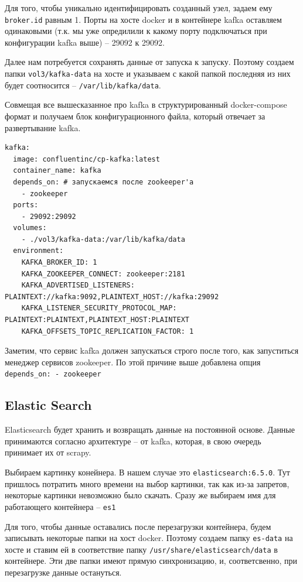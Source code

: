 Для того, чтобы уникально идентифицировать созданный узел, задаем ему
\verb|broker.id| равным 1. Порты на хосте docker и в контейнере kafka оставляем
одинаковыми (т.к. мы уже опредилили к какому порту подключаться при конфигурации
kafka выше) -- 29092 к 29092.

Далее нам потребуется сохранять данные от запуска к запуску. Поэтому создаем
папки \verb|vol3/kafka-data| на хосте и указываем с какой папкой последняя из
них будет соотносится -- \verb|/var/lib/kafka/data|.

Совмещая все вышесказанное про kafka в структурированный docker-compose формат и
получаем блок конфигурационного файла, который отвечает за развертывание kafka.
\begin{verbatim}
kafka:
  image: confluentinc/cp-kafka:latest
  container_name: kafka
  depends_on: # запускаемся после zookeeper'а
    - zookeeper
  ports:
    - 29092:29092
  volumes:
    - ./vol3/kafka-data:/var/lib/kafka/data
  environment:
    KAFKA_BROKER_ID: 1
    KAFKA_ZOOKEEPER_CONNECT: zookeeper:2181
    KAFKA_ADVERTISED_LISTENERS: PLAINTEXT://kafka:9092,PLAINTEXT_HOST://kafka:29092
    KAFKA_LISTENER_SECURITY_PROTOCOL_MAP: PLAINTEXT:PLAINTEXT,PLAINTEXT_HOST:PLAINTEXT
    KAFKA_OFFSETS_TOPIC_REPLICATION_FACTOR: 1
\end{verbatim}

Заметим, что сервис kafka должен запускаться строго после того, как запуститься
менеджер сервисов zookeeper. По этой причине выше добавлена опция
\verb|depends_on: - zookeeper|


\subsection{Elastic Search}
Elasticsearch будет хранить и возвращать данные на постоянной основе. Данные
принимаются согласно архитектуре -- от kafka, которая, в свою очередь принимает
их от scrapy.

Выбираем картинку конейнера. В нашем случае это \verb|elasticsearch:6.5.0|. Тут
пришлось потратить много времени на выбор картинки, так как из-за запретов,
некоторые картинки невозможно было скачать. Сразу же выбираем имя для
работающего контейнера -- \verb|es1|

Для того, чтобы данные оставались после перезагрузки контейнера, будем
записывать некоторые папки на хост docker. Поэтому создаем папку \verb|es-data|
на хосте и ставим ей в соответствие папку \verb|/usr/share/elasticsearch/data| в
контейнере. Эти две папки имеют прямую синхронизацию, и, соответсвенно, при
перезагрузке данные остануться.

